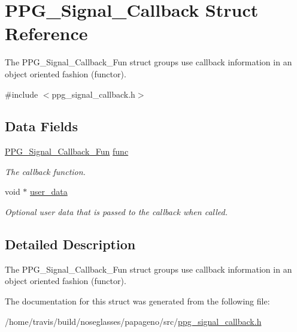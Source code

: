 \hypertarget{structPPG__Signal__Callback}{\section{P\-P\-G\-\_\-\-Signal\-\_\-\-Callback Struct Reference}
\label{structPPG__Signal__Callback}
}


The P\-P\-G\-\_\-\-Signal\-\_\-\-Callback\-\_\-\-Fun struct groups use callback information in an object oriented fashion (functor).  




{\ttfamily \#include $<$ppg\-\_\-signal\-\_\-callback.\-h$>$}

\subsection*{Data Fields}
\begin{DoxyCompactItemize}
\item 
\hypertarget{structPPG__Signal__Callback_ac9f0b113465cfcfdf6413a149cfc48c6}{\hyperlink{ppg__signal__callback_8h_a476c7da6f898f27317b11235b3880c8c}{P\-P\-G\-\_\-\-Signal\-\_\-\-Callback\-\_\-\-Fun} \hyperlink{structPPG__Signal__Callback_ac9f0b113465cfcfdf6413a149cfc48c6}{func}}\label{structPPG__Signal__Callback_ac9f0b113465cfcfdf6413a149cfc48c6}

\begin{DoxyCompactList}\small\item\em The callback function. \end{DoxyCompactList}\item 
\hypertarget{structPPG__Signal__Callback_aed96ddb4b654409c06553376b73870f2}{void $\ast$ \hyperlink{structPPG__Signal__Callback_aed96ddb4b654409c06553376b73870f2}{user\-\_\-data}}\label{structPPG__Signal__Callback_aed96ddb4b654409c06553376b73870f2}

\begin{DoxyCompactList}\small\item\em Optional user data that is passed to the callback when called. \end{DoxyCompactList}\end{DoxyCompactItemize}


\subsection{Detailed Description}
The P\-P\-G\-\_\-\-Signal\-\_\-\-Callback\-\_\-\-Fun struct groups use callback information in an object oriented fashion (functor). 

The documentation for this struct was generated from the following file\-:\begin{DoxyCompactItemize}
\item 
/home/travis/build/noseglasses/papageno/src/\hyperlink{ppg__signal__callback_8h}{ppg\-\_\-signal\-\_\-callback.\-h}\end{DoxyCompactItemize}

